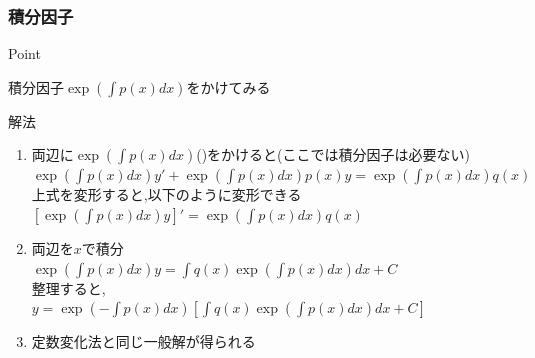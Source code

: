 \documentclass[a4paper]{jsarticle}
\begin{document}
\subsubsection{積分因子}
\begin{itembox}[l]{Point}
    \begin{center}
        積分因子$\exp{\left(\int p\left(x\right)dx\right)}$をかけてみる
    \end{center}
\end{itembox}
\begin{itembox}[l]{解法}
    \begin{enumerate}[(1)]
        \item 両辺に$\exp{\left(\int p\left(x\right)dx\right)}$()をかけると(ここでは積分因子は必要ない)\\
              $\exp{\left(\int p\left(x\right)dx\right)}y'+\exp{\left(\int p\left(x\right)dx\right)}p\left(x\right)y=\exp{\left(\int p\left(x\right)dx\right)}q\left(x\right)$\\
              上式を変形すると,以下のように変形できる\\
              $\left[\exp{\left(\int p\left(x\right)dx\right)}y\right]'=\exp{\left(\int p\left(x\right)dx\right)}q\left(x\right)$
        \item 両辺を$x$で積分\\
              $\exp{\left(\int p\left(x\right)dx\right)}y=\int q\left(x\right)\exp{\left(\int p\left(x\right)dx\right)}dx+C$\\
              整理すると,\\
              $y=\exp{\left(-\int p\left(x\right)dx\right)}\left[\int q\left(x\right)\exp{\left(\int p\left(x\right)dx\right)}dx+C\right]$
        \item 定数変化法と同じ一般解が得られる
    \end{enumerate}
\end{itembox}
\end{document}
